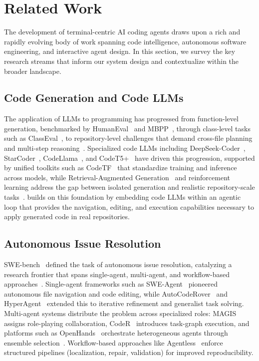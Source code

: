\section{Related Work}
\label{sec:related_work}

The development of terminal-centric AI coding agents draws upon a rich and rapidly evolving body of work spanning code intelligence, autonomous software engineering, and interactive agent design. In this section, we survey the key research streams that inform our system design and contextualize \name within the broader landscape.

\subsection{Code Generation and Code LLMs}
The application of LLMs to programming has progressed from function-level generation, benchmarked by HumanEval~\cite{chen2021evaluatinglargelanguagemodels} and MBPP~\cite{austin2021programsynthesislargelanguage}, through class-level tasks such as ClassEval~\cite{classeval}, to repository-level challenges that demand cross-file planning and multi-step reasoning~\cite{code_survey}. Specialized code LLMs including DeepSeek-Coder~\cite{deepseek_coder}, StarCoder~\cite{starcoder}, CodeLlama~\cite{codellama}, and CodeT5+~\cite{wang2023codet5p} have driven this progression, supported by unified toolkits such as CodeTF~\cite{bui2023codetf} that standardize training and inference across models, while Retrieval-Augmented Generation~\cite{lewis2020rag} and reinforcement learning address the gap between isolated generation and realistic repository-scale tasks~\cite{code_survey}. \name builds on this foundation by embedding code LLMs within an agentic loop that provides the navigation, editing, and execution capabilities necessary to apply generated code in real repositories.

\subsection{Autonomous Issue Resolution}
SWE-bench~\cite{jimenez2024swebenchlanguagemodelsresolve} defined the task of autonomous issue resolution, catalyzing a research frontier that spans single-agent, multi-agent, and workflow-based approaches~\cite{issue_resolution_survey}. Single-agent frameworks such as SWE-Agent~\cite{yang2024sweagentagentcomputerinterfacesenable} pioneered autonomous file navigation and code editing, while AutoCodeRover~\cite{zhang2024autocoderoverautonomousprogramimprovement} and HyperAgent~\cite{phan2024hyperagent} extended this to iterative refinement and generalist task solving. Multi-agent systems distribute the problem across specialized roles: MAGIS~\cite{tao2024magisllmbasedmultiagent} assigns role-playing collaboration, CodeR~\cite{chen2024coderissueresolvingmultiagent} introduces task-graph execution, and platforms such as OpenHands~\cite{openhands} orchestrate heterogeneous agents through ensemble selection~\cite{issue_resolution_survey}. Workflow-based approaches like Agentless~\cite{xia2024agentless} enforce structured pipelines (localization, repair, validation) for improved reproducibility.

